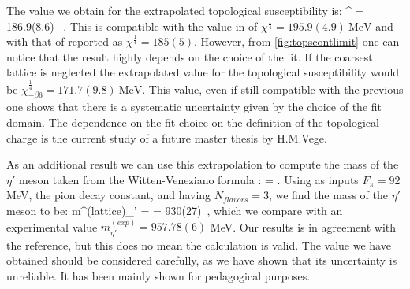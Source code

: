 The value we obtain for the extrapolated topological susceptibility is:
\beq
    \chi^{} = 186.9(8.6)~ .
    \label{val:tops}
\eeq 
This is compatible with the value in \cite{shindler_nucleon_2015} of  $\chi^{\frac{1}{4}} = 195.9(4.9)~\text{MeV} $ and with that of \cite{ce_testing_2015} reported as $\chi^{\frac{1}{4}} = 185(5)$. However, from \cref{fig:topscontlimit} one can notice that the result highly depends on the choice of the fit. If the coarsest lattice is neglected the extrapolated value for the topological susceptibility would be $\chi^{\frac{1}{4}}_{-\beta 6} = 171.7(9.8)~\text{MeV}$. This value, even if still compatible with the previous one shows that there is a systematic uncertainty given by the choice of the fit domain. The  dependence on the fit choice on the definition of the topological charge is the current study of a future master thesis by H.M.Vege. 

As an additional result we can use this extrapolation to compute the mass of the $\eta'$ meson taken from the Witten-Veneziano formula \cite{witten_current_1979}:
\beq
    \chi = .
\eeq 
Using as inputs $F_\pi = 92$ MeV, the pion decay constant, and having $N_{flavors} = 3$, we find the mass of the $\eta'$ meson to be:
\beq    
    m^{(lattice)}_{\eta'} =  = 930(27)~,
\eeq
which we compare with an experimental value  $m^{(exp)}_{\eta'} = 957.78(6)$ MeV. Our results is in agreement with the reference, but this does no mean the calculation is valid. The value we have obtained should be considered carefully, as we have shown that its uncertainty is unreliable. It has been mainly shown for pedagogical purposes.